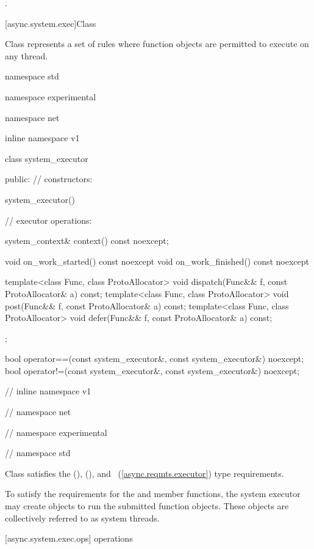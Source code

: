 \begin{itemdescr}
\pnum
\returns {}.
\end{itemdescr}



[async.system.exec]{Class }

%
\pnum
Class  represents a set of rules where function objects are permitted to execute on any thread.

\begin{codeblock}
namespace std {
namespace experimental {
namespace net {
inline namespace v1 {

  class system_executor
  {
  public:
    // constructors:

    system_executor() {}

    // executor operations:

    system_context& context() const noexcept;

    void on_work_started() const noexcept {}
    void on_work_finished() const noexcept {}

    template<class Func, class ProtoAllocator>
      void dispatch(Func&& f, const ProtoAllocator& a) const;
    template<class Func, class ProtoAllocator>
      void post(Func&& f, const ProtoAllocator& a) const;
    template<class Func, class ProtoAllocator>
      void defer(Func&& f, const ProtoAllocator& a) const;
  };

  bool operator==(const system_executor&, const system_executor&) noexcept;
  bool operator!=(const system_executor&, const system_executor&) noexcept;

} // inline namespace v1
} // namespace net
} // namespace experimental
} // namespace std
\end{codeblock}

\pnum
Class  satisfies the  (),  (), and ~(\ref{async.reqmts.executor}) type requirements.

\pnum
To satisfy the  requirements for the  and  member functions, the system executor may create  objects to run the submitted function objects. These  objects are collectively referred to as system threads.


[async.system.exec.ops]{ operations}

